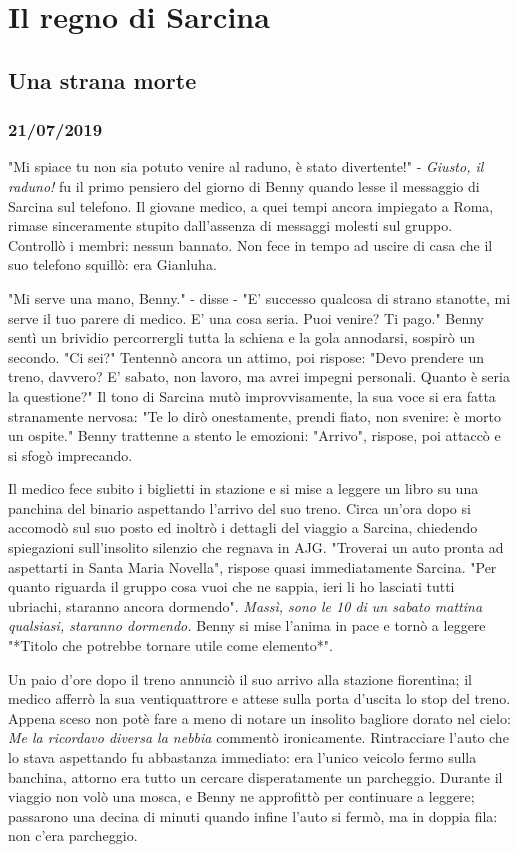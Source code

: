 \chapter{Il regno di Sarcina}
\section{Una strana morte}
\subsection*{21/07/2019}


"Mi spiace tu non sia potuto venire al raduno, è stato divertente!" - \textit{Giusto, il raduno!} fu il primo pensiero del giorno di Benny quando lesse il messaggio di Sarcina sul telefono. Il giovane medico, a quei tempi ancora impiegato a Roma, rimase sinceramente stupito dall'assenza di messaggi molesti sul gruppo. Controllò i membri: nessun bannato. Non fece in tempo ad uscire di casa che il suo telefono squillò: era Gianluha.

"Mi serve una mano, Benny." - disse - "E' successo qualcosa di strano stanotte, mi serve il tuo parere di medico. E' una cosa seria. Puoi venire? Ti pago."
Benny sentì un brividio percorrergli tutta la schiena e la gola annodarsi, sospirò un secondo.
"Ci sei?"
Tentennò ancora un attimo, poi rispose: "Devo prendere un treno, davvero? E' sabato, non lavoro, ma avrei impegni personali. Quanto è seria la questione?" 
Il tono di Sarcina mutò improvvisamente, la sua voce si era fatta stranamente nervosa: "Te lo dirò onestamente, prendi fiato, non svenire: è morto un ospite."
Benny trattenne a stento le emozioni: "Arrivo", rispose, poi attaccò e si sfogò imprecando.

Il medico fece subito i biglietti in stazione e si mise a leggere un libro su una panchina del binario aspettando l'arrivo del suo treno.
Circa un'ora dopo si accomodò sul suo posto ed inoltrò i dettagli del viaggio a Sarcina, chiedendo spiegazioni sull'insolito silenzio che regnava in AJG.
"Troverai un auto pronta ad aspettarti in Santa Maria Novella", rispose quasi immediatamente Sarcina. "Per quanto riguarda il gruppo cosa vuoi che ne sappia, ieri li ho lasciati tutti ubriachi, staranno ancora dormendo".
\textit{Massì, sono le 10 di un sabato mattina qualsiasi, staranno dormendo.} Benny si mise l'anima in pace e tornò a leggere "*Titolo che potrebbe tornare utile come elemento*".

Un paio d'ore dopo il treno annunciò il suo arrivo alla stazione fiorentina; il medico afferrò la sua ventiquattrore e attese sulla porta d'uscita lo stop del treno. Appena sceso non potè fare a meno di notare un insolito bagliore dorato nel cielo: \textit{Me la ricordavo diversa la nebbia} commentò ironicamente.
Rintracciare l'auto che lo stava aspettando fu abbastanza immediato: era l'unico veicolo fermo sulla banchina, attorno era tutto un cercare disperatamente un parcheggio.
Durante il viaggio non volò una mosca, e Benny ne approfittò per continuare a leggere; passarono una decina di minuti quando infine l'auto si fermò, ma in doppia fila: non c'era parcheggio. 

